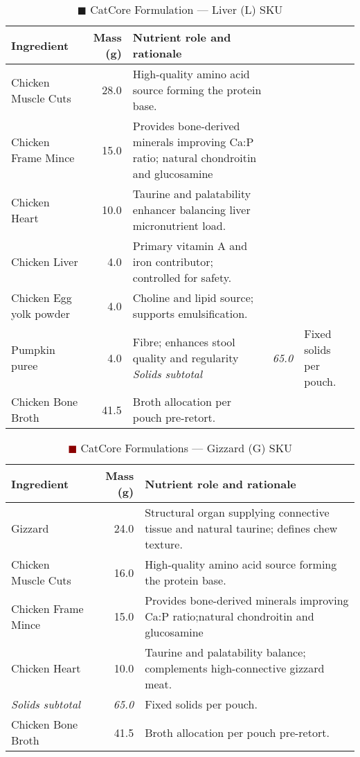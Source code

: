 \begin{table}[htbp]
\centering
\caption{\textcolor{lightred}{$\blacksquare$} CatCore Formulation --- Liver (L) SKU}
\label{tab:liver_sku_3col}
\begin{adjustbox}{max width=\textwidth}
\begin{tabular}{@{}l r p{8.0cm}@{}}
\toprule
\textbf{Ingredient} & \textbf{Mass (g)} & \textbf{Nutrient role and rationale} \\
\midrule
Chicken Muscle Cuts & 28.0 & High-quality amino acid source forming the protein base. \\[3pt]
Chicken Frame Mince & 15.0 & Provides bone-derived minerals improving Ca:P ratio; natural chondroitin and glucosamine \\[3pt]
Chicken Heart & 10.0 & Taurine and palatability enhancer balancing liver micronutrient load. \\[3pt]
Chicken Liver & 4.0 & Primary vitamin A and iron contributor; controlled for safety. \\[3pt]
Chicken Egg yolk powder & 4.0 & Choline and lipid source; supports emulsification. \\[3pt]
Pumpkin puree & 4.0 & Fibre; enhances stool quality and regularity 
\textit{Solids subtotal} & \textit{65.0} & Fixed solids per pouch. \\[3pt]
Chicken Bone Broth & 41.5 & Broth allocation per pouch pre-retort. \\[3pt]
\bottomrule
\end{tabular}
\end{adjustbox}
\end{table}

\begin{table}[htbp]
\centering
\caption{\textcolor{darkred}{$\blacksquare$} CatCore  Formulations --- Gizzard (G) SKU}
\label{tab:gizzard_sku_3col}
\begin{adjustbox}{max width=\textwidth}
\begin{tabular}{@{}l r p{8.0cm}@{}}
\toprule
\textbf{Ingredient} & \textbf{Mass (g)} & \textbf{Nutrient role and rationale} \\
\midrule
Gizzard & 24.0 & Structural organ supplying connective tissue and natural taurine; defines chew texture. \\[3pt]
Chicken Muscle Cuts & 16.0 & High-quality amino acid source forming the protein base. \\[3pt]
Chicken Frame Mince & 15.0 & Provides bone-derived minerals improving Ca:P ratio;natural chondroitin and glucosamine  \\[3pt]
Chicken Heart & 10.0 & Taurine and palatability balance; complements high-connective gizzard meat. \\[3pt]
\textit{Solids subtotal} & \textit{65.0} & Fixed solids per pouch. \\[3pt]
Chicken Bone Broth & 41.5 & Broth allocation per pouch pre-retort. \\[3pt]
\bottomrule
\end{tabular}
\end{adjustbox}
\end{table}

